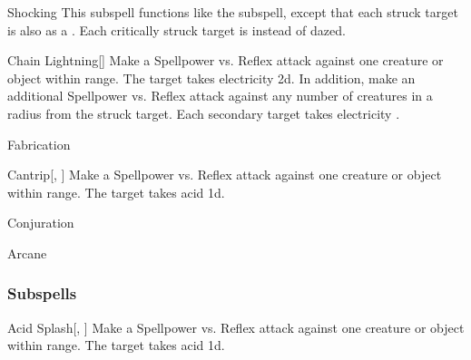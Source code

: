 \begin{ability}[\nth{5}]{Shocking}
This subspell functions like the  subspell, except that each struck target is also  as a .
Each critically struck target is  instead of dazed.
\end{ability}
\vspace{0.25em}


\begin{ability}[\nth{6}]{Chain Lightning}[]
Make a Spellpower vs. Reflex attack against one creature or object within \rngmed range.
\hit The target takes electricity  \plus2d.
In addition, make an additional Spellpower vs. Reflex attack against any number of creatures in a \areamed radius from the struck target.
\hit Each secondary target takes electricity .
\end{ability}
\vspace{0.25em}

\newpage
\begin{spellsection}{Fabrication}

\begin{spellheader}
\end{spellheader}


\begin{ability}{Cantrip}[, ]
Make a Spellpower vs. Reflex attack against one creature or object within \rngmed range.
\hit The target takes acid  \minus1d.
\end{ability}




 Conjuration

 Arcane
\end{spellsection}


\subsubsection{Subspells}


\begin{ability}[\nth{1}]{Acid Splash}[, ]
Make a Spellpower vs. Reflex attack against one creature or object within \rngmed range.
\hit The target takes acid  \plus1d.
\end{ability}
\vspace{0.25em}


